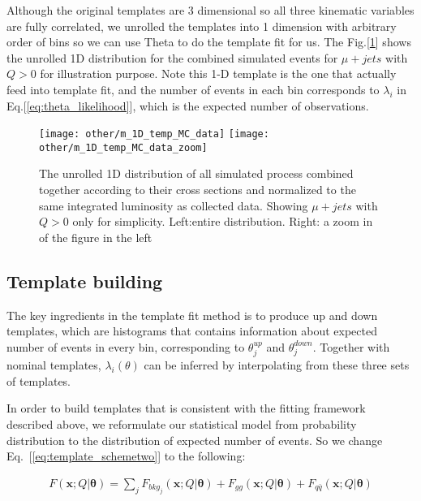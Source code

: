 \documentclass{cmspaperpdf}
\begin{document}
Although the original templates are 3 dimensional so  all three kinematic variables are fully correlated, we unrolled the templates into 1 dimension with arbitrary order of bins so we can use Theta to do the template fit for us. The Fig.[\ref{fig:1D template}] shows the unrolled 1D distribution for the combined simulated events for $\mu+jets$ with $Q>0$ for illustration purpose. Note this 1-D template is the one that actually feed into template fit, and the number of events in each bin corresponds to $\lambda_i$ in Eq.[\ref{eq:theta_likelihood}], which is the expected number of observations. 

\begin{figure}[hbt]
  \begin{center}
    \texttt{[image: other/m\_1D\_temp\_MC\_data]}
    \texttt{[image: other/m\_1D\_temp\_MC\_data\_zoom]}
    
  \caption{\small The unrolled 1D distribution of all simulated process combined together according to their cross sections and normalized to the same integrated luminosity as collected data. Showing $\mu + jets$ with $Q>0$ only for simplicity. Left:entire distribution. Right: a zoom in of the figure in the left }
    \label{fig:1D template}
  \end{center}
\end{figure}


\subsection{Template building}
The key ingredients in the template fit method is to produce up and down templates, which are histograms that contains information about expected number of events in every bin, corresponding to $\theta_j^{up}$ and $\theta_j^{down}$. Together with nominal templates, $\lambda_i(\theta)$ can be inferred by interpolating from these three sets of templates. 

In order to build templates that is consistent with the fitting framework described above, we reformulate our statistical model from  probability distribution to the distribution of expected number of events. So we change Eq.~[\ref{eq:template_schemetwo}] to the following:

\begin{align}
F(\bm{x};Q|\bm{\theta}) = \sum_j F_{bkg_j}(\bm{x};Q|\bm{\theta})+F_{gg}(\bm{x};Q|\bm{\theta})+F_{q\bar{q}}(\bm{x};Q|\bm{\theta})
\end{align}
\end{document}
